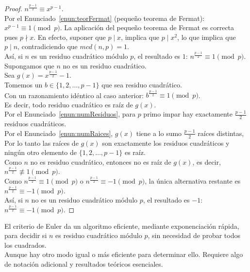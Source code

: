 \begin{proof}
$n^{\frac{p-1}{2}} \equiv x^{p-1}$. \\
Por el Enunciado~\ref{enun:teorFermat} (pequeño teorema de Fermat): $x^{p-1} \equiv 1 \pmod{p}$. La aplicación del pequeño teorema de Fermat es correcta pues $p \nmid x$.
En efecto, suponer que $p \mid x$, implica que $p \mid x^2$, lo que implica que $p \mid n$, contradiciendo que $mcd(n,p)=1$. \\
Así, si $n$ es un residuo cuadrático módulo $p$, el resultado es $1$: $n^{\frac{p-1}{2}} \equiv 1 \pmod{p}$. \\
Supongamos que $n$ no es un residuo cuadrático. \\
Sea $g(x) = x^{\frac{p-1}{2}} - 1$. \\
Tomemos un $b \in \{1,2,\dots,p-1\}$ que sea residuo cuadrático. \\
Con un razonamiento idéntico al caso anterior: $b^{\frac{p-1}{2}} \equiv 1 \pmod{p}$. \\
Es decir, todo residuo cuadrático es raíz de $g(x)$. \\
Por el Enunciado~\ref{enun:numResiduos}, para $p$ primo impar hay exactamente $\frac{p-1}{2}$ residuos cuadráticos. \\
Por el Enunciado~\ref{enun:numRaices}, $g(x)$  tiene a lo sumo $\frac{p-1}{2}$ raíces distintas, \\
Por lo tanto las raíces de $g(x)$ son exactamente los residuos cuadráticos y ningún otro elemento de $\{1,2,\dots,p-1\}$ es raíz. \\
Como $n$ no es residuo cuadrático, entonces no es raíz de $g(x)$, es decir, $n^{\frac{p-1}{2}} \not\equiv 1 \pmod p$. \\
Como $n^{\frac{p-1}{2}} \equiv 1 \pmod{p}$ o $n^{\frac{p-1}{2}} \equiv -1 \pmod{p}$, la única alternativa restante es $n^{\frac{p-1}{2}} \equiv -1 \pmod p$. \\
Así, si $n$ no es un residuo cuadrático módulo $p$, el resultado es $-1$: $n^{\frac{p-1}{2}} \equiv -1 \pmod{p}$. 
\end{proof}

El criterio de Euler da un algoritmo eficiente, mediante exponenciación rápida, para decidir si $n$ es residuo cuadrático módulo $p$, sin necesidad de probar todos los cuadrados. \\
Aunque hay otro modo igual o más eficiente para determinar ello. Requiere algo de notación adicional y resultados teóricos esenciales. \\

